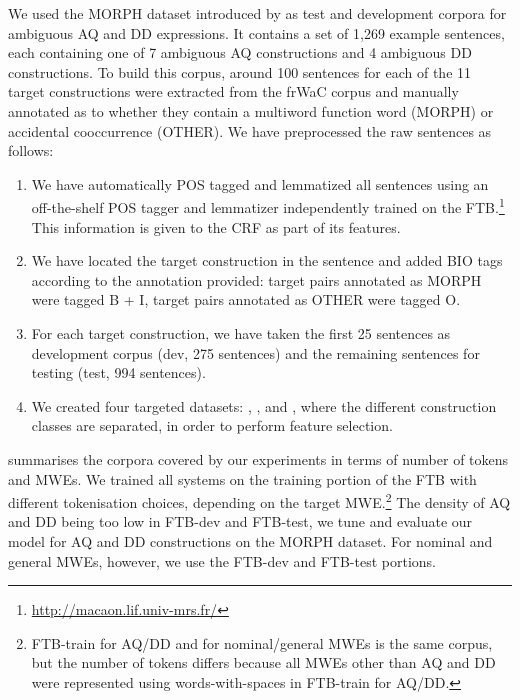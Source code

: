 \documentclass[output=paper,
modfonts
]{langscibook}
\begin{document}
We used the MORPH dataset introduced by \citet{nasr:acl:2015} as test and development corpora for ambiguous AQ and DD expressions. It contains a set of 1,269 example sentences, each containing one of %
7 ambiguous AQ constructions and 4 ambiguous DD constructions. To build this corpus, around 100 sentences for each of the 11 target constructions were extracted from the frWaC corpus and manually annotated as to whether they contain a multiword function word (MORPH) or accidental cooccurrence (OTHER). We have preprocessed the raw sentences as follows:
\begin{enumerate}
 \item We have automatically POS tagged and lemmatized all sentences using an off-the-shelf POS tagger and lemmatizer independently trained on the FTB.\footnote{\url{http://macaon.lif.univ-mrs.fr/}} This information is given to the CRF as part of its features.
 \item We have located the target construction in the sentence and added BIO tags according to the annotation provided: target pairs annotated as MORPH were tagged {\textsc B} + {\textsc I}, target pairs annotated as OTHER were tagged {\textsc O}.
 \item For each target construction, we have taken the first 25 sentences as development corpus (dev, 275 sentences) and the remaining sentences for testing (test, 994 sentences).
 \item We created four targeted datasets: \devAQ{}, \devDD{}, \fullAQ{} and \fullDD{}, where the different construction classes are separated, in order to perform feature selection.
\end{enumerate}

 summarises the corpora covered by our experiments in terms of number of tokens and MWEs. We trained all systems on the training portion of the FTB with different tokenisation choices, depending on the target MWE.\footnote{FTB-train for AQ/DD and for nominal/general MWEs is the same corpus, but the number of tokens differs because all MWEs other than AQ and DD were represented using words-with-spaces in FTB-train for AQ/DD.} The density of AQ and DD being too low in FTB-dev and FTB-test, we tune and evaluate our model for AQ and DD constructions on the MORPH dataset. For nominal and general MWEs, however, we use the FTB-dev and FTB-test portions.
\end{document}
